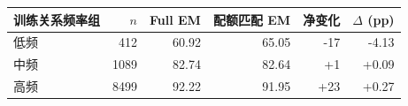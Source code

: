 \begin{tabular}{lrrrrr}
\toprule
训练关系频率组 & $n$ & Full EM & 配额匹配 EM & 净变化 & $\Delta$ (pp) \\
\midrule
低频 & 412 & 60.92 & 65.05 & -17 & -4.13 \\
中频 & 1089 & 82.74 & 82.64 & +1 & +0.09 \\
高频 & 8499 & 92.22 & 91.95 & +23 & +0.27 \\
\bottomrule
\end{tabular}
